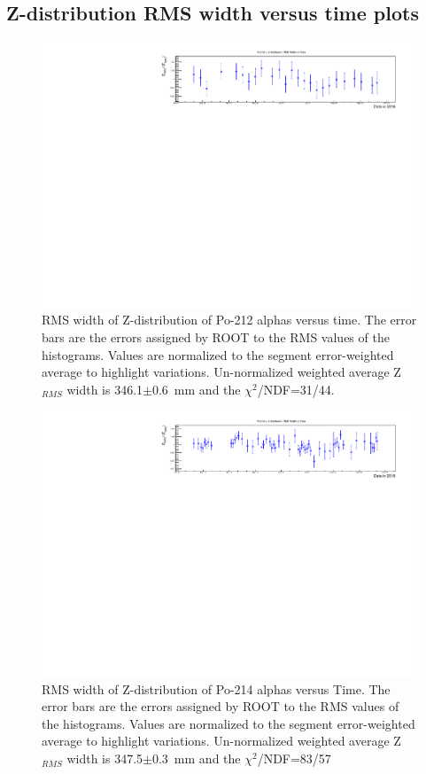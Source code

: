 \subsection{Z-distribution RMS width versus time plots}
\begin{figure}[!h]
\centering
\includegraphics[width=1.05\textwidth]{figures/PubBiPo212ZrmsvsT.pdf}
\caption{\label{fig:ZRMSvsT212}RMS width of Z-distribution of Po-212 alphas versus time. The error bars are the errors assigned by ROOT to the RMS values of the histograms. Values are normalized to the segment error-weighted average to highlight variations. Un-normalized weighted average Z$_{RMS}$ width is 346.1$\pm$0.6~mm and the $\chi^2$/NDF=31/44. }
\end{figure}
\begin{figure}[!h]
\centering
\includegraphics[width=1.05\textwidth]{figures/PubBiPo214ZrmsvsT.pdf}
\caption{\label{fig:ZRMSvsT214}RMS width of Z-distribution of Po-214 alphas versus Time. The error bars are the errors assigned by ROOT to the RMS values of the histograms. Values are normalized to the segment error-weighted average to highlight variations. Un-normalized weighted average Z$_{RMS}$ width is 347.5$\pm$0.3~mm and the $\chi^2$/NDF=83/57}
\end{figure}
\newpage
